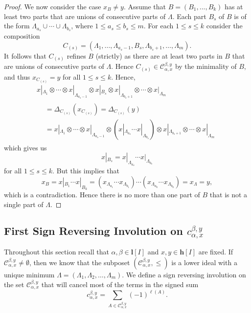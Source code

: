 \documentclass[10pt]{amsart}
\theoremstyle{definition}
\newcommand{\bh}{\mathbf{h}}
\begin{document}
\begin{proof}
We now consider the case $x_B\ne y$.
Assume that $B=(B_1,...,B_k)$ has at least two parts that are unions of consecutive parts of $\Lambda$. Each part $B_s$ of $B$ is of the form $\Lambda_{a_s}\cup\cdots\cup\Lambda_{b_s}$, where $1\leq a_s\leq b_s\leq m$. For each $1\leq s\leq k$ consider the composition 
 $$ C_{(s)}=(\Lambda_1,\ldots,\Lambda_{a_s-1},B_s,\Lambda_{b_s+1},\ldots,\Lambda_m).
 $$
It follows that $C_{(s)}$ refines $B$ (strictly) as there are at least two parts in $B$ that are unions of consecutive parts of $\Lambda$. Hence $C_{(s)}\in \mathcal{C}_{\alpha,x}^{\beta,y}$ by the minimality of $B$, and thus $x_{C_{(s)}}=y$ for all $1\le s\le k$. Hence,
 \begin{multline*}
x|_{\Lambda_1}\otimes\cdots\otimes x|_{\Lambda_{a_s-1}}\otimes x|_{B_s}\otimes x|_{\Lambda_{b_s+1}} 
 \otimes\cdots\otimes x|_{\Lambda_m} \\
 \begin{aligned}
 &= \Delta_{C_{(s)}}(x_{C_{(s)}}) = \Delta_{C_{(s)}}(y) \\
 &= x|_{\Lambda_1}\otimes\cdots\otimes x|_{\Lambda_{a_s-1}}\otimes(x|_{\Lambda_{a_s}}\cdots x|_{\Lambda_{b_s}})\otimes x|_{\Lambda_{b_s+1}}
 \otimes\cdots\otimes x|_{\Lambda_m}
 \end{aligned}
\end{multline*}
 which gives us
 $$ x|_{B_s} = x|_{\Lambda_{a_s}}\cdots x|_{\Lambda_{b_s}}$$
 for all $1\le s\le k$. But this implies that
 $$ x_B = x|_{B_1} \cdots x|_{B_k} =(x_{\Lambda_{a_1}}\cdots x_{\Lambda_{b_1}})\cdots (x_{\Lambda_{a_k}}\cdots x_{\Lambda_{b_k}})=x_\Lambda=y,$$
 which is a contradiction. Hence there is no more than one part of $B$ that is not a single part of $\Lambda$.
\end{proof}

\subsection{First Sign Reversing Involution on \texorpdfstring{$c_{\alpha,x}^{\beta,y}$}{c alpha,x beta,y}}\label{ss:involution}
Throughout this section recall that $\alpha,\beta\in\mathbf{l} [I]$ and $x,y\in\bh [I]$ are fixed. If $\mathcal{C}_{\alpha,x}^{\beta,y}\ne\emptyset$, then we know that the subposet $(\mathcal{C}_{\alpha,x}^{\beta,y},\le)$ is a lower ideal with a unique minimum $\Lambda=(\Lambda_1,\Lambda_2,\ldots,\Lambda_m)$. 
We define a sign reversing involution on the set $\mathcal{C}_{\alpha,x}^{\beta,y}$ that will cancel most of the terms in the signed sum
\begin{equation}\label{eq:anticoef}
 c_{\alpha,x}^{\beta,y}=\sum_{A\in \mathcal{C}_{\alpha,x}^{\beta,y}} (-1)^{\ell(A)}.
\end{equation}
\end{document}
